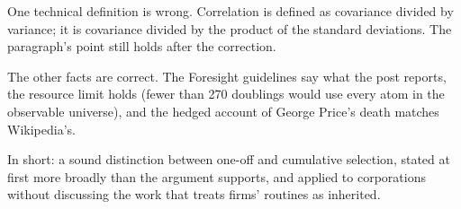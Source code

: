 \begin{afterword}
One technical definition is wrong. Correlation is defined as covariance divided by variance; it is covariance divided by the product of the standard deviations. The paragraph's point still holds after the correction.

The other facts are correct. The Foresight guidelines say what the post reports, the resource limit holds (fewer than 270 doublings would use every atom in the observable universe), and the hedged account of George Price's death matches Wikipedia's.

In short: a sound distinction between one-off and cumulative selection, stated at first more broadly than the argument supports, and applied to corporations without discussing the work that treats firms' routines as inherited.
\end{afterword}
